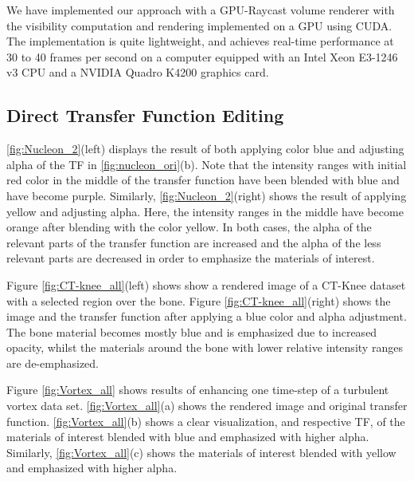 \documentclass[twoside,twocolumn,10pt]{article}
\begin{document}
We have implemented our approach with a GPU-Raycast volume renderer with the visibility computation and rendering implemented on a GPU using CUDA. The implementation is quite lightweight, and achieves real-time performance at 30 to 40 frames per second on a computer equipped with an Intel Xeon E3-1246 v3 CPU and a NVIDIA Quadro K4200 graphics card.

\subsection{Direct Transfer Function Editing}

\autoref{fig:Nucleon_2}(left) displays the result of both applying color blue and adjusting alpha of the TF in \autoref{fig:nucleon_ori}(b). Note that the intensity ranges with initial red color in the middle of the transfer function have been blended with blue and have become purple.
Similarly, \autoref{fig:Nucleon_2}(right) shows the result of applying yellow and adjusting alpha. Here, the intensity ranges in the middle have become orange after blending with the color yellow. 
In both cases, the alpha of the relevant parts of the transfer function are increased and the alpha of the less relevant parts are decreased in order to emphasize the materials of interest.

Figure \ref{fig:CT-knee_all}(left) shows show a rendered image of a CT-Knee dataset with a selected region over the bone. Figure \ref{fig:CT-knee_all}(right) shows the image and the transfer function after applying a blue color and alpha adjustment. The bone material becomes mostly blue and is emphasized due to increased opacity, whilst the materials around the bone with lower relative intensity ranges are de-emphasized.

Figure \ref{fig:Vortex_all} shows results of enhancing one time-step of a turbulent vortex data set.
\autoref{fig:Vortex_all}(a) shows the rendered image and original transfer function.
\autoref{fig:Vortex_all}(b) shows a clear visualization, and respective TF, of the materials of interest blended with blue and emphasized with higher alpha.
Similarly, \autoref{fig:Vortex_all}(c) shows the materials of interest blended with yellow and emphasized with higher alpha.
\end{document}
